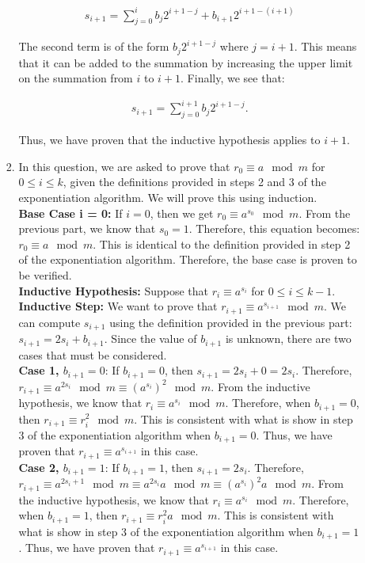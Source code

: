 \documentclass[11pt]{article}
\theoremstyle{definition}
\begin{document}
\begin{enumerate}
\begin{enumerate}
\begin{enumerate}
\begin{align*}
    s_{i+1} = \sum_{j=0}^i b_j2^{i+1-j} + b_{i+1}2^{i+1-(i+1)}
\end{align*}

The second term is of the form $b_j2^{i+1-j}$ where $j = i + 1$. This means that it can be added to the summation by increasing the upper limit on the summation from $i$ to $i + 1$. Finally, we see that:

\begin{align*}
    s_{i+1} = \sum_{j=0}^{i+1} b_j2^{i+1-j}.
\end{align*}

Thus, we have proven that the inductive hypothesis applies to $i+1$.

\item In this question, we are asked to prove that $r_0 \equiv a \mod{m}$ for $0 \leq i \leq k$, given the definitions provided in steps 2 and 3 of the exponentiation algorithm. We will prove this using induction. \\

\textbf{Base Case i = 0:} If $i = 0$, then we get $r_0 \equiv a^{s_0} \mod{m}$. From the previous part, we know that $s_0 = 1$. Therefore, this equation becomes: $r_0 \equiv a \mod{m}$. This is identical to the definition provided in step 2 of the exponentiation algorithm. Therefore, the base case is proven to be verified. \\

\textbf{Inductive Hypothesis:} Suppose that $r_i \equiv a^{s_i}$ for $0 \leq i \leq k - 1$. \\

\textbf{Inductive Step:} We want to prove that $r_{i+1} \equiv a^{s_{i+1}} \mod{m}$. We can compute $s_{i+1}$ using the definition provided in the previous part: $s_{i+1} = 2s_i + b_{i+1}$. Since the value of $b_{i+1}$ is unknown, there are two cases that must be considered. \\

\textbf{Case 1, $b_{i+1} = 0$}: If $b_{i+1} = 0$, then $s_{i+1} = 2s_i + 0 = 2s_i$. Therefore, $r_{i+1} \equiv a^{2s_i} \mod{m} \equiv (a^{s_i})^2 \mod{m}$. From the inductive hypothesis, we know that $r_i \equiv a^{s_i} \mod{m}$. Therefore, when $b_{i+1} = 0$, then $r_{i+1} \equiv r_i^2 \mod{m}$. This is consistent with what is show in step 3 of the exponentiation algorithm when $b_{i+1} = 0$. Thus, we have proven that $r_{i+1} \equiv a^{s_{i+1}}$ in this case. \\

\textbf{Case 2, $b_{i+1} = 1$}: If $b_{i+1} = 1$, then $s_{i+1} = 2s_i$. Therefore, $r_{i+1} \equiv a^{2s_i+1} \mod{m} \equiv a^{2s_i}a \mod{m} \equiv (a^{s_i})^2a \mod{m}$. From the inductive hypothesis, we know that $r_i \equiv a^{s_i} \mod{m}$. Therefore, when $b_{i+1} = 1$, then $r_{i+1} \equiv r_i^2a \mod{m}$. This is consistent with what is show in step 3 of the exponentiation algorithm when $b_{i+1} = 1$. Thus, we have proven that $r_{i+1} \equiv a^{s_{i+1}}$ in this case. \\


\end{enumerate}
\end{enumerate}
\end{enumerate}
\end{document}
